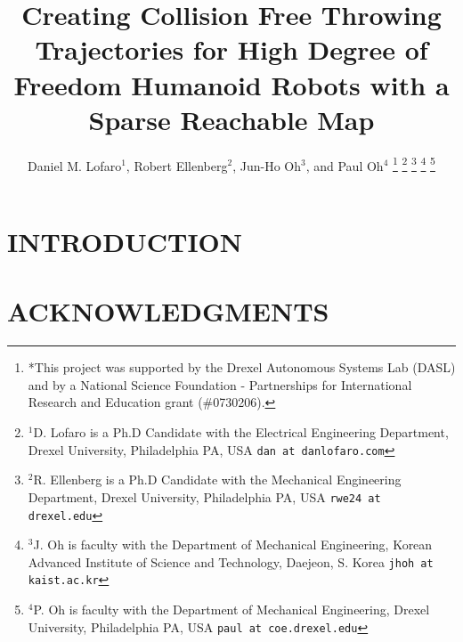 \documentclass[letterpaper, 10 pt, conference]{ieeeconf}  %
\title{\LARGE \bf
Creating Collision Free Throwing Trajectories for High Degree of Freedom Humanoid Robots with a Sparse Reachable Map
}
\author{Daniel M. Lofaro$^{1}$, Robert Ellenberg$^{2}$, Jun-Ho Oh$^{3}$, and Paul Oh$^{4}$%
\thanks{*This project was supported by the Drexel Autonomous Systems Lab (DASL) and by a National Science Foundation - Partnerships for International Research and Education grant (\#0730206).}%
\thanks{$^{1}$D. Lofaro is a Ph.D Candidate with the Electrical Engineering Department, Drexel University, Philadelphia PA, USA
        {\tt\small dan at danlofaro.com}}%
\thanks{$^{2}$R. Ellenberg is a Ph.D Candidate with the Mechanical Engineering Department, Drexel University, Philadelphia PA, USA
        {\tt\small rwe24 at drexel.edu}}%
\thanks{$^{3}$J. Oh is faculty with the Department of Mechanical Engineering, Korean Advanced Institute of Science and Technology, Daejeon, S. Korea
        {\tt\small jhoh at kaist.ac.kr}}%
\thanks{$^{4}$P. Oh is faculty with the Department of Mechanical Engineering, Drexel University, Philadelphia PA, USA
        {\tt\small paul at coe.drexel.edu}}%
}
\begin{document}
\maketitle
\thispagestyle{empty}
\pagestyle{empty}



\begin{abstract}
	
\end{abstract}


\section{INTRODUCTION}
	
	
%	
	
	
	

	

	

	
	
%	

\section{ACKNOWLEDGMENTS}
	

\end{document}
